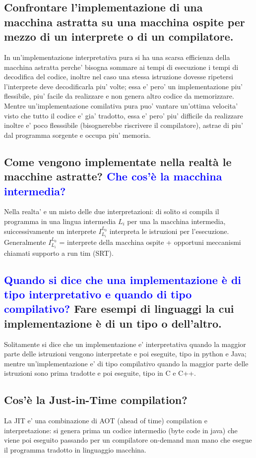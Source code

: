 \documentclass{article}
\begin{document}
\subsection{Confrontare l'implementazione di una macchina astratta su una macchina ospite per mezzo di un interprete o di un compilatore.}
In un'implementazione interpretativa pura si ha una scarsa efficienza della
macchina astratta perche' bisogna sommare ai tempi di esecuzione i tempi di
decodifica del codice, inoltre nel caso una stessa istruzione dovesse ripetersi
l'interprete deve decodificarla piu' volte; essa e' pero' un implementazione
piu' flessibile, piu' facile da realizzare e non genera altro codice da
memorizzare. Mentre un'implementazione comilativa pura puo' vantare un'ottima
velocita' visto che tutto il codice e' gia' tradotto, essa e' pero' piu'
difficile da realizzare inoltre e' poco flesssibile (bisognerebbe riscrivere il
compilatore), astrae di piu' dal programma sorgente e occupa piu' memoria.
\subsection{Come vengono implementate nella realtà le macchine astratte? \textcolor{blue}{Che cos'è la macchina intermedia?}}
Nella realta' e un misto delle due interpretazioni: di solito si compila il programma in una lingua intermedia $L_i$ per una la macchina intermedia, suiccessivamente un interprete $I^{L_0}_{L_i}$ interpreta le istruzioni per l'esecuzione.
Generalmente $I^{L_0}_{L_i}$ = interprete della macchina ospite + opportuni meccanismi chiamati supporto a run tim (SRT).
\subsection{\textcolor{blue}{Quando si dice che una implementazione è di tipo interpretativo e quando di tipo compilativo?} Fare esempi di linguaggi la cui implementazione è di un tipo o dell'altro.}
Solitamente si dice che un implementazione e' interpretativa quando la maggior parte delle istruzioni vengono interpretate e poi eseguite, tipo in python e Java; mentre
un'implementazione e' di tipo compilativo quando la maggior parte delle istruzioni sono prima tradotte e poi eseguite, tipo in C e C++.
\subsection{Cos'è la Just-in-Time compilation?}
La JIT e' una combinazione di AOT (ahead of time) compilation e
interpretazione: si genera prima un codice intermedio (byte code in java) che
viene poi eseguito passando per un compilatore on-demand man mano che esegue il
programma tradotto in linguaggio macchina.
\end{document}
